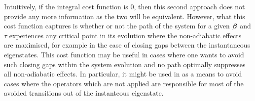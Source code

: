 Intuitively, if the integral cost function is $0$, then this second approach does not provide any more information as the two will be equivalent. However, what this cost function captures is whether or not the path of the system for a given $\boldsymbol{\beta}$ and $\tau$ experiences any critical point in its evolution where the non-adiabatic effects are maximised, for example in the case of closing gaps between the instantaneous eigenstates. This cost function may be useful in cases where one wants to avoid such closing gaps within the system evolution and no path optimally suppresses all non-adiabatic effects. In particular, it might be used in  as a means to avoid cases where the  operators which are not applied are responsible for most of the avoided transitions out of the instanteous eigenstate.